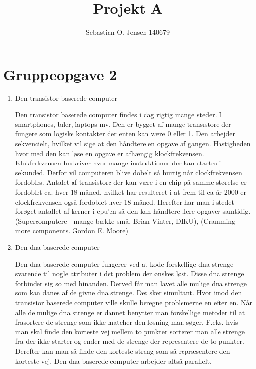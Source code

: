\documentclass[12pt]{article}
\title{Projekt A}
\author{Sebastian O. Jensen 140679}
\begin{document}
\maketitle
\section{Gruppeopgave 2}
\begin{enumerate}
\item Den transistor baserede computer

Den transistor baserede computer findes i dag rigtig mange steder.  I
smartphones, biler, laptops mv. Den er bygget af mange transistore der fungere som logiske
kontakter der enten kan være 0 eller 1. Den arbejder sekvencielt, hvilket
vil sige at den håndtere en opgave af gangen. Hastigheden hvor med den kan løse en
opgave er afhængig klockfrekvensen. Klokfrekvensen beskriver hvor mange
instruktioner der kan startes i sekunded. Derfor vil computeren blive dobelt så
hurtig når clockfrekvensen fordobles. Antalet af transistore der
kan være i en chip på samme størelse er fordoblet ca. hver
18 måned, hvilket har resulteret i at frem til ca år 2000 er clockfrekvensen
også fordoblet hver 18 måned. Herefter har man i stedet forøget antallet af
kerner i cpu'en så den kan håndtere flere opgaver samtidig. (Supercomputere -
mange bække små, Brian Vinter, DIKU), (Cramming more components. Gordon E.
Moore)

\item Den dna baserede computer

Den dna baserede computer fungerer ved at kode forskellige dna
strenge svarende til nogle atributer i det problem der ønskes løst. Disse dna
strenge forbinder sig so med hinanden. Derved får man lavet alle mulige dna
strenge som kan danes af de givne dna strenge. Det sker simultant. Hvor imod den
transistor baserede computer ville skulle beregne problemerne en efter en. Når
alle de mulige dna strenge er dannet benytter man forskellige metoder til at
frasortere de strenge som ikke matcher den løsning man søger. F.eks. hvis man
skal finde den korteste vej mellem to punkter sorterer man alle strenge fra der
ikke starter og ender med de strenge der representere de to punkter. Derefter
kan man så finde den korteste streng som så repræsentere den korteste vej. Den
dna baserede computer arbejder altså parallelt.




\end{enumerate}
\end{document}
